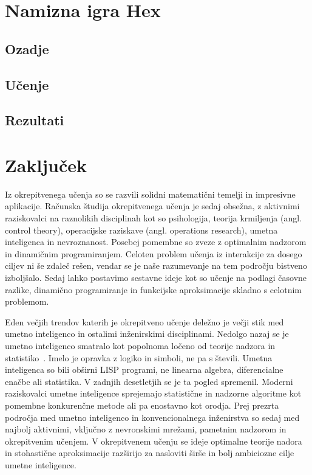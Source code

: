 \documentclass[a4paper, oneside, 12pt]{report}
\begin{document}


\chapter{Namizna igra Hex}
\thispagestyle{fancy}
\section{Ozadje}
\section{Učenje}
\section{Rezultati}

\chapter{Zaključek}
\thispagestyle{fancy}
Iz okrepitvenega učenja so se razvili solidni matematični temelji in impresivne aplikacije. Računska študija okrepitvenega učenja je sedaj obsežna, z aktivnimi raziskovalci na raznolikih disciplinah kot so psihologija, teorija krmiljenja (angl. control theory), operacijske raziskave (angl. operations research), umetna inteligenca in nevroznanost. Posebej pomembne so zveze z optimalnim nadzorom in dinamičnim programiranjem. Celoten problem učenja iz interakcije za dosego ciljev ni še zdaleč rešen, vendar se je naše razumevanje na tem področju bistveno izboljšalo. Sedaj lahko postavimo sestavne ideje kot so učenje na podlagi časovne razlike, dinamično programiranje in funkcijske aproksimacije skladno s celotnim problemom.

Eden večjih trendov katerih je okrepitveno učenje deležno je večji stik med umetno inteligenco in ostalimi inženirskimi disciplinami. Nedolgo nazaj se je umetno inteligenco smatralo kot popolnoma ločeno od teorije nadzora in statistiko~\cite{ReinforcementLearningAnIntroduction}. Imelo je opravka z logiko in simboli, ne pa s števili. Umetna inteligenca so bili obširni LISP programi, ne linearna algebra, diferencialne enačbe ali statistika. V zadnjih desetletjih se je ta pogled spremenil. Moderni raziskovalci umetne inteligence sprejemajo statistične in nadzorne algoritme kot pomembne konkurenčne metode ali pa enostavno kot orodja. Prej prezrta področja med umetno inteligenco in konvencionalnega inženirstva so sedaj med najbolj aktivnimi, vključno z nevronskimi mrežami, pametnim nadzorom in okrepitvenim učenjem. V okrepitvenem učenju se ideje optimalne teorije nadora in stohastične aproksimacije razširijo za nasloviti širše in bolj ambiciozne cilje umetne inteligence.
\end{document}

